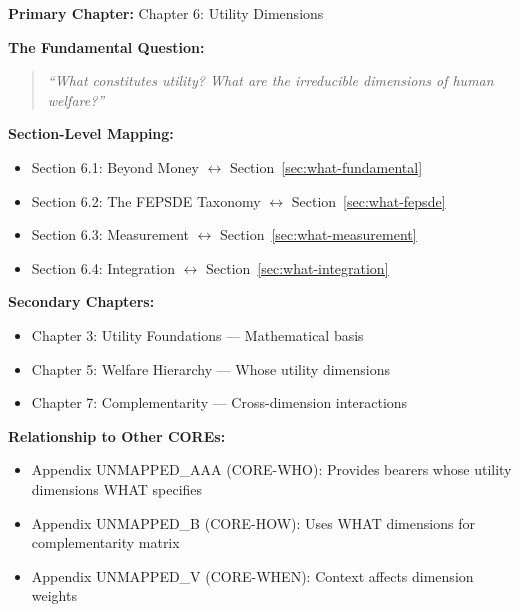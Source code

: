\begin{tcolorbox}[colback=purple!5!white, colframe=purple!75!black,
    title=Chapter Linkage]

\textbf{Primary Chapter:} Chapter 6: Utility Dimensions

\vspace{0.3em}
\textbf{The Fundamental Question:}
\begin{quote}
\textit{``What constitutes utility? What are the irreducible dimensions of human welfare?''}
\end{quote}

\textbf{Section-Level Mapping:}
\begin{itemize}[nosep]
\item Section 6.1: Beyond Money $\leftrightarrow$ Section~\ref{sec:what-fundamental}
\item Section 6.2: The FEPSDE Taxonomy $\leftrightarrow$ Section~\ref{sec:what-fepsde}
\item Section 6.3: Measurement $\leftrightarrow$ Section~\ref{sec:what-measurement}
\item Section 6.4: Integration $\leftrightarrow$ Section~\ref{sec:what-integration}
\end{itemize}

\textbf{Secondary Chapters:}
\begin{itemize}[nosep]
\item Chapter 3: Utility Foundations --- Mathematical basis
\item Chapter 5: Welfare Hierarchy --- Whose utility dimensions
\item Chapter 7: Complementarity --- Cross-dimension interactions
\end{itemize}

\textbf{Relationship to Other COREs:}
\begin{itemize}[nosep]
\item Appendix UNMAPPED_AAA (CORE-WHO): Provides bearers whose utility dimensions WHAT specifies
\item Appendix UNMAPPED_B (CORE-HOW): Uses WHAT dimensions for complementarity matrix
\item Appendix UNMAPPED_V (CORE-WHEN): Context affects dimension weights
\end{itemize}

\end{tcolorbox}


